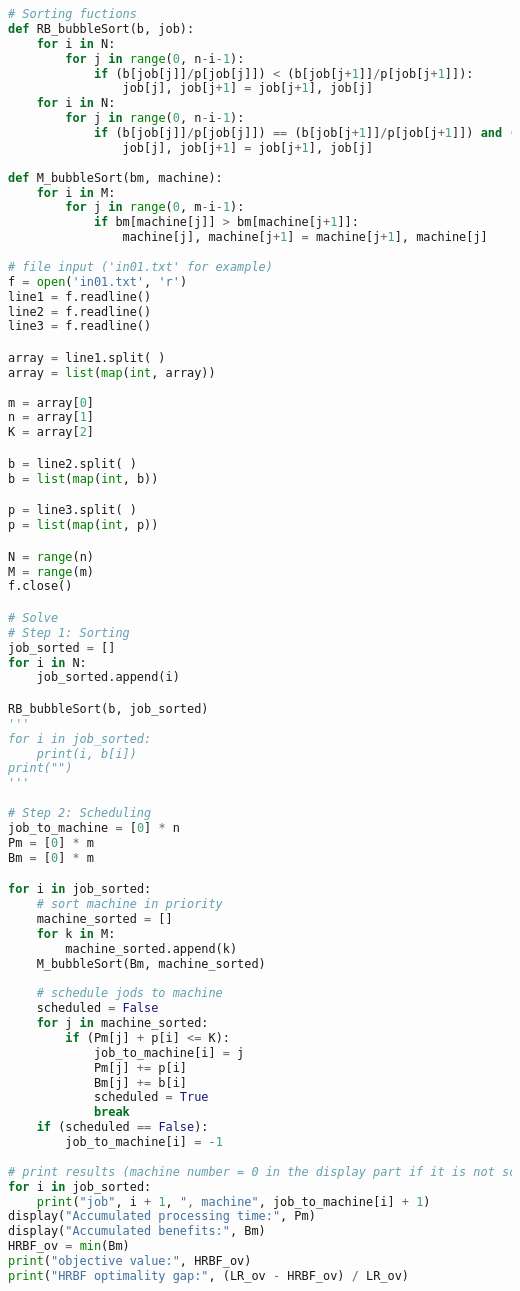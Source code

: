 \documentclass{article}
\begin{document}
\begin{lstlisting}[breaklines = true, language=Python]
# Sorting fuctions
def RB_bubbleSort(b, job):
    for i in N:
        for j in range(0, n-i-1):
            if (b[job[j]]/p[job[j]]) < (b[job[j+1]]/p[job[j+1]]):
                job[j], job[j+1] = job[j+1], job[j]        
    for i in N:
        for j in range(0, n-i-1):
            if (b[job[j]]/p[job[j]]) == (b[job[j+1]]/p[job[j+1]]) and (b[job[j]] < b[job[j+1]]):
                job[j], job[j+1] = job[j+1], job[j]
                
def M_bubbleSort(bm, machine):
    for i in M:
        for j in range(0, m-i-1):
            if bm[machine[j]] > bm[machine[j+1]]:
                machine[j], machine[j+1] = machine[j+1], machine[j]
                
# file input ('in01.txt' for example)
f = open('in01.txt', 'r')
line1 = f.readline()
line2 = f.readline()
line3 = f.readline()

array = line1.split( )
array = list(map(int, array))
    
m = array[0]
n = array[1]
K = array[2]

b = line2.split( )
b = list(map(int, b))

p = line3.split( )
p = list(map(int, p))

N = range(n)
M = range(m)
f.close()

# Solve
# Step 1: Sorting
job_sorted = []
for i in N:
    job_sorted.append(i)

RB_bubbleSort(b, job_sorted)
'''
for i in job_sorted:
    print(i, b[i])
print("")
'''
    
# Step 2: Scheduling
job_to_machine = [0] * n
Pm = [0] * m
Bm = [0] * m

for i in job_sorted:
    # sort machine in priority
    machine_sorted = []
    for k in M:
        machine_sorted.append(k)
    M_bubbleSort(Bm, machine_sorted)
    
    # schedule jods to machine
    scheduled = False
    for j in machine_sorted:
        if (Pm[j] + p[i] <= K):
            job_to_machine[i] = j
            Pm[j] += p[i]
            Bm[j] += b[i]
            scheduled = True
            break         
    if (scheduled == False):
        job_to_machine[i] = -1
        
# print results (machine number = 0 in the display part if it is not scheduled)
for i in job_sorted:
    print("job", i + 1, ", machine", job_to_machine[i] + 1)
display("Accumulated processing time:", Pm)
display("Accumulated benefits:", Bm)
HRBF_ov = min(Bm)
print("objective value:", HRBF_ov)
print("HRBF optimality gap:", (LR_ov - HRBF_ov) / LR_ov)
\end{lstlisting}
\end{document}
